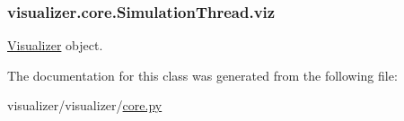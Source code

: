 \subsubsection[{\texorpdfstring{viz}{viz}}]{\setlength{\rightskip}{0pt plus 5cm}visualizer.\+core.\+Simulation\+Thread.\+viz}\hypertarget{classvisualizer_1_1core_1_1SimulationThread_ab3615e7268de3c70ec0d11c6b595d7ec}{}\label{classvisualizer_1_1core_1_1SimulationThread_ab3615e7268de3c70ec0d11c6b595d7ec}


\hyperlink{classvisualizer_1_1core_1_1Visualizer}{Visualizer} object. 



The documentation for this class was generated from the following file\+:\begin{DoxyCompactItemize}
\item 
visualizer/visualizer/\hyperlink{visualizer_2visualizer_2core_8py}{core.\+py}\end{DoxyCompactItemize}
